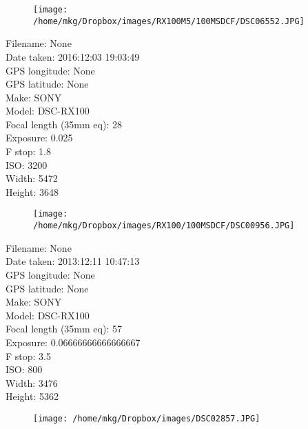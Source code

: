 \clearpage
\recalctypearea
\newpage
\noindent
\begin{figure}
    \texttt{[image: /home/mkg/Dropbox/images/RX100M5/100MSDCF/DSC06552.JPG]}
\end{figure}

\clearpage
\recalctypearea
\newpage
\noindent
Filename: None\\ 
Date taken: 2016:12:03 19:03:49\\ 
GPS longitude: None\\ 
GPS latitude: None\\ 
Make: SONY\\ 
Model: DSC-RX100\\ 
Focal length (35mm eq): 28\\ 
Exposure: 0.025\\ 
F stop: 1.8\\ 
ISO: 3200\\ 
Width: 5472\\ 
Height: 3648\\ 

\clearpage
\recalctypearea
\newpage
\noindent
\begin{figure}
    \texttt{[image: /home/mkg/Dropbox/images/RX100/100MSDCF/DSC00956.JPG]}
\end{figure}

\clearpage
\recalctypearea
\newpage
\noindent
Filename: None\\ 
Date taken: 2013:12:11 10:47:13\\ 
GPS longitude: None\\ 
GPS latitude: None\\ 
Make: SONY\\ 
Model: DSC-RX100\\ 
Focal length (35mm eq): 57\\ 
Exposure: 0.06666666666666667\\ 
F stop: 3.5\\ 
ISO: 800\\ 
Width: 3476\\ 
Height: 5362\\ 

\clearpage
\recalctypearea
\newpage
\noindent
\begin{figure}
    \texttt{[image: /home/mkg/Dropbox/images/DSC02857.JPG]}
\end{figure}


